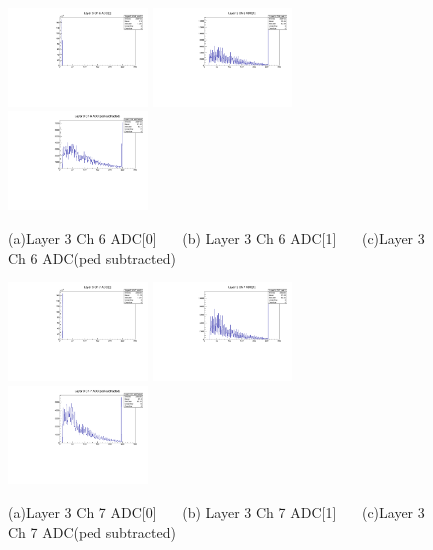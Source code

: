 \documentclass[a4paper,11pt]{article}
\theoremstyle{mytheor}
\begin{document}
\begin{figure}[H] 
\vspace*{-0.3cm} 
\includegraphics[width=0.33\textwidth,scale=0.5,trim=0 0 0 0,clip]{plotsdir/file0_test-Layer3_Ch6_adc0-1.pdf} 
\includegraphics[width=0.33\textwidth,scale=0.5,trim=0 0 0 0,clip]{plotsdir/file0_test-Layer3_Ch6_adc1-1.pdf} 
\includegraphics[width=0.33\textwidth,scale=0.5,trim=0 0 0 0,clip]{plotsdir/file0_test-Layer3_Ch6_adcPedsub-1.pdf} 
\caption{(a)Layer 3 Ch 6 ADC[0] ~~~(b) Layer 3 Ch 6 ADC[1] ~~~(c)Layer 3 Ch 6 ADC(ped subtracted) } 
\end{figure} 
\begin{figure}[H] 
\vspace*{-0.3cm} 
\includegraphics[width=0.33\textwidth,scale=0.5,trim=0 0 0 0,clip]{plotsdir/file0_test-Layer3_Ch7_adc0-1.pdf} 
\includegraphics[width=0.33\textwidth,scale=0.5,trim=0 0 0 0,clip]{plotsdir/file0_test-Layer3_Ch7_adc1-1.pdf} 
\includegraphics[width=0.33\textwidth,scale=0.5,trim=0 0 0 0,clip]{plotsdir/file0_test-Layer3_Ch7_adcPedsub-1.pdf} 
\caption{(a)Layer 3 Ch 7 ADC[0] ~~~(b) Layer 3 Ch 7 ADC[1] ~~~(c)Layer 3 Ch 7 ADC(ped subtracted) } 
\end{figure} 
\end{document}
